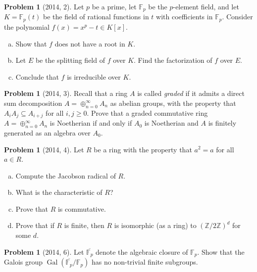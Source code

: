 \documentclass{article}
\newcommand{\<}{\langle} %
\renewcommand{\>}{\rangle} %
\DeclareMathOperator{\Gal}{Gal}
\theoremstyle{plain}
\theoremstyle{remark}
\theoremstyle{definition}
\newtheorem{examproblem}[equation]{Problem}
\begin{document}
\begin{examproblem}[2014, 2]
	Let $p$ be a prime, let $\mathbb F_p$ be the $p$-element field,
	and let $K=\mathbb F_p(t)$ be the field of rational functions in
	$t$ with coefficients in $\mathbb F_p$. Consider the polynomial $f(x)=
	x^p-t\in K[x]$.
	\begin{enumerate}[(a)]
		\item Show that $f$ does not have a root in $K$.
		\item Let $E$ be the splitting field of $f$ over $K$.
			Find the factorization of $f$ over $E$.
		\item Conclude that $f$ is irreducible over $K$.
	\end{enumerate}
\end{examproblem}

\begin{examproblem}[2014, 3]
	Recall that a ring $A$ is called \textit{graded} if it admits a direct
	sum decomposition $A=\oplus_{n=0}^{\infty}A_n$ as abelian groups, with the
	property that $A_iA_j\subseteq A_{i+j}$ for all $i,j\geq 0$.
	Prove that a graded commutative ring $A=\oplus_{n=0}^{\infty} A_n$
	is Noetherian if and only if $A_0$ is Noetherian and $A$ is finitely
	generated as an algebra over $A_0$.
\end{examproblem}

\begin{examproblem}[2014, 4]
	Let $R$ be a ring with the property that $a^2=a$ for all $a\in R$.
	\begin{enumerate}[(a)]
		\item Compute the Jacobson radical of $R$.
		\item What is the characteristic of $R$?
		\item Prove that $R$ is commutative.
		\item Prove that if $R$ is finite, then $R$ is isomorphic
			(as a ring) to $(\mathbb Z/2\mathbb Z)^d$ for some $d$.
	\end{enumerate}
\end{examproblem}

\begin{examproblem}[2014, 6]
	Let $\overline{\mathbb F_p}$ denote the algebraic closure of $\mathbb F_p$. Show that
	the Galois group $\Gal(\overline{\mathbb F_p}/\mathbb F_p)$
	has no non-trivial finite subgroups.
\end{examproblem}
\end{document}
